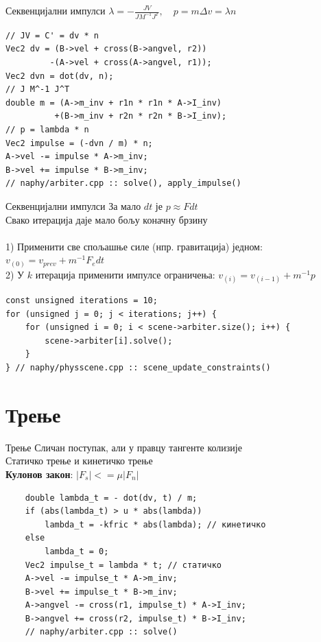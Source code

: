 \documentclass[]{beamer}
\begin{document}
\begin{frame}[fragile]{Секвенцијални импулси}
    $\lambda = -\frac{JV}{J M^{-1} J^T},\quad p = m \Delta v = \lambda n $
    \begin{verbatim}
// JV = C' = dv * n
Vec2 dv = (B->vel + cross(B->angvel, r2))
         -(A->vel + cross(A->angvel, r1));
Vec2 dvn = dot(dv, n);
// J M^-1 J^T
double m = (A->m_inv + r1n * r1n * A->I_inv)
          +(B->m_inv + r2n * r2n * B->I_inv);
// p = lambda * n
Vec2 impulse = (-dvn / m) * n;
A->vel -= impulse * A->m_inv;
B->vel += impulse * B->m_inv;
// naphy/arbiter.cpp :: solve(), apply_impulse()
    \end{verbatim}
\end{frame}

\begin{frame}[fragile]{Секвенцијални импулси}
    За мало $dt$ је $p \approx F dt$ \\
    Свако итерација даје мало бољу коначну брзину \\
    \\
    1) Применити све спољашње силе (нпр. гравитација) једном: \\
    $v_{(0)} = v_{prev} + m^{-1} F_e dt$ \\
    2) У $k$ итерација применити импулсе ограничења:
    $v_{(i)} = v_{(i-1)} + m^{-1} p$
    \begin{verbatim}
const unsigned iterations = 10;
for (unsigned j = 0; j < iterations; j++) {
    for (unsigned i = 0; i < scene->arbiter.size(); i++) {
        scene->arbiter[i].solve();
    }
} // naphy/physscene.cpp :: scene_update_constraints()
    \end{verbatim}
\end{frame}


\section{Трење}
\begin{frame}[fragile]{Трење}
    Сличан поступак, али у правцу тангенте колизије \\
    Статичко трење и кинетичко трење \\
    \textbf{Кулонов закон}: $|F_s| <= \mu |F_n| $
    \begin{verbatim}
    double lambda_t = - dot(dv, t) / m;
    if (abs(lambda_t) > u * abs(lambda))
        lambda_t = -kfric * abs(lambda); // кинетичко
    else
        lambda_t = 0;
    Vec2 impulse_t = lambda * t; // статичко
    A->vel -= impulse_t * A->m_inv;
    B->vel += impulse_t * B->m_inv;
    A->angvel -= cross(r1, impulse_t) * A->I_inv;
    B->angvel += cross(r2, impulse_t) * B->I_inv;
    // naphy/arbiter.cpp :: solve()
    \end{verbatim}
\end{frame}
\end{document}
